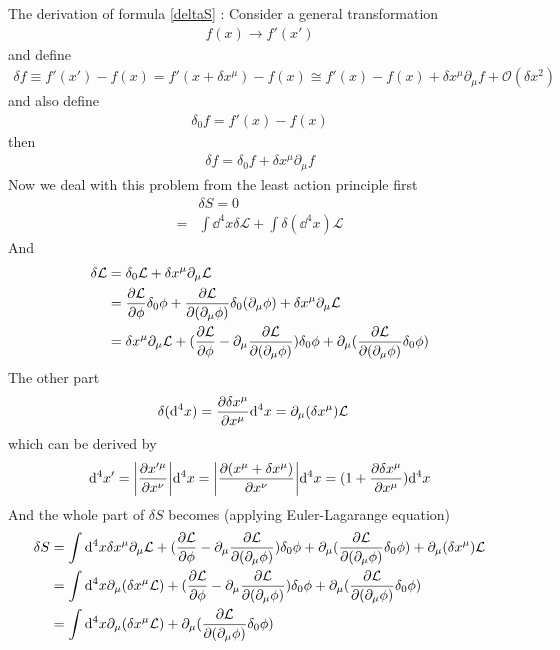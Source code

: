 \documentclass{article}
\newcommand{\id}{\int\dd^4x}
\newcommand{\lag}{\mathcal{L}}
\begin{document}
The derivation of formula \eqref{deltaS} :
Consider a general transformation
\begin{align*}
  f(x)\rightarrow f'(x')
\end{align*}
and define
\begin{align*}
  \delta f\equiv f'(x')-f(x)=f'(x+\delta x^{\mu})-f(x)\cong f'(x)-f(x)+\delta x^{\mu}\partial_{\mu}f+\mathcal{O}(\delta x^2)
\end{align*}
and also define
\begin{align*}
  \delta_0 f=f'(x)-f(x)
\end{align*}
then
\begin{align*}
  \delta f=\delta_0 f+\delta x^{\mu}\partial_{\mu}f
\end{align*}
Now we deal with this problem from the least action principle first
\begin{align*}
  &\delta S=0\\
  =&\id\delta\lag+\int\delta(\dd^4x)\lag
\end{align*}
And
\begin{align*}
  \delta\lag&=\delta_0\lag+\delta x^{\mu}\partial_{\mu}\lag\\
  &=\pdv{\lag}{\phi}\delta_0\phi+\pdv{\lag}{(\partial_{\mu}\phi)}\delta_0(\partial_{\mu}\phi)+\delta x^{\mu}\partial_{\mu}\lag\\
  &=\delta x^{\mu}\partial_{\mu}\lag+(\pdv{\lag}{\phi}-\partial_{\mu}\pdv{\lag}{(\partial_{\mu}\phi)})\delta_0\phi+\partial_{\mu}(\pdv{\lag}{(\partial_{\mu}\phi)}\delta_0\phi)
\end{align*}
The other part
\begin{align*}
  \delta(\dd^4x)&=\pdv{\delta x^{\mu}}{x^{\mu}}\dd^4x=\partial_{\mu}(\delta x^{\mu})\lag
\end{align*}
which can be derived by
\begin{align*}
  \dd^4x'=\abs{\pdv{x'^{\mu}}{x^{\nu}}}\dd^4x=\abs{\pdv{(x^{\mu}+\delta x^{\mu})}{x^{\nu}}}\dd^4x=(1+\pdv{\delta x^{\mu}}{x^{\mu}})\dd^4x
\end{align*}
And the whole part of $\delta S$ becomes (applying Euler-Lagarange equation)
\begin{align*}
  \delta S&=\id \delta x^{\mu}\partial_{\mu}\lag+(\pdv{\lag}{\phi}-\partial_{\mu}\pdv{\lag}{(\partial_{\mu}\phi)})\delta_0\phi+\partial_{\mu}(\pdv{\lag}{(\partial_{\mu}\phi)}\delta_0\phi)+ \partial_{\mu}(\delta x^{\mu})\lag\\
  &=\id \partial_{\mu}(\delta x^{\mu}\lag)+(\pdv{\lag}{\phi}-\partial_{\mu}\pdv{\lag}{(\partial_{\mu}\phi)})\delta_0\phi+\partial_{\mu}(\pdv{\lag}{(\partial_{\mu}\phi)}\delta_0\phi)\\
  &=\id \partial_{\mu}(\delta x^{\mu}\lag)+\partial_{\mu}(\pdv{\lag}{(\partial_{\mu}\phi)}\delta_0\phi)
\end{align*}
\end{document}

